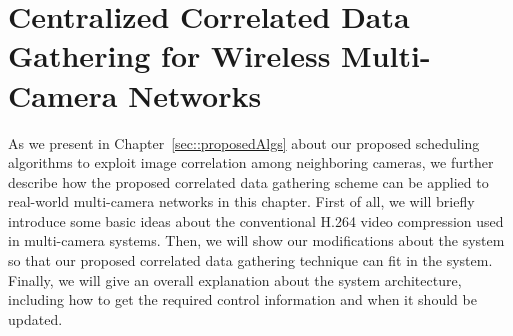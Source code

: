 \section{Centralized Correlated Data Gathering for Wireless Multi-Camera Networks}
\label{sec::protocolDesign}
As we present in Chapter~\ref{sec::proposedAlgs} about our proposed scheduling algorithms to exploit image correlation among neighboring cameras, we further describe how the proposed correlated data gathering scheme can be applied to real-world multi-camera networks in this chapter.
First of all, we will briefly introduce some basic ideas about the conventional H.264 video compression used in multi-camera systems.
Then, we will show our modifications about the system so that our proposed correlated data gathering technique can fit in the system.
Finally, we will give an overall explanation about the system architecture, including how to get the required control information and when it should be updated.
%
%
